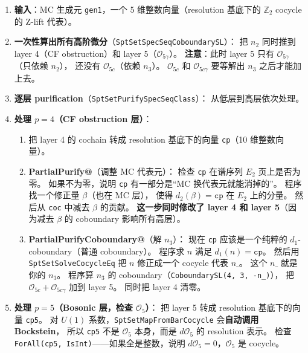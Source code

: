 \documentclass[a4paper,fontset=ubuntu,12pt]{ctexart}
\begin{document}
\begin{enumerate}
\item \textbf{输入}：MC 生成元 \texttt{gen1}，一个 5 维整数向量（resolution 基底下的 $\mathbb{Z}_2$ cocycle 的 Z-lift 代表）。

\item \textbf{一次性算出所有高阶微分}（\texttt{SptSetSpecSeqCoboundarySL}）：
      把 $n_2$ 同时推到 layer 4（CF obstruction）和 layer 5（$\mathcal{O}_{5\gamma}$）。
      \textbf{注意}：此时 layer 5 只有 $\mathcal{O}_{5\gamma}$（只依赖 $n_2$），
      还没有 $\mathcal{O}_{5c}$（依赖 $n_3$）。
      $\mathcal{O}_{5c}$ 和 $\mathcal{O}_{5c\gamma}$ 要等解出 $n_3$ 之后才能加上去。

\item \textbf{逐层 purification}（\texttt{SptSetPurifySpecSeqClass}）：
      从低层到高层依次处理。

\item \textbf{处理 $p=4$（CF obstruction 层）}：
      \begin{enumerate}[label=(\alph*)]
      \item 把 layer 4 的 cochain 转成 resolution 基底下的向量 \texttt{cp}（10 维整数向量）。
      \item \textbf{PartialPurify@}（调整 MC 代表元）：
            检查 \texttt{cp} 在谱序列 $E_2$ 页上是否为零。
            如果不为零，说明 \texttt{cp} 有一部分是``MC 换代表元就能消掉的''。
            程序找一个修正量 $\beta$（也在 MC 层），
            使得 $d_2(\beta) = \texttt{cp}$ 在 $E_2$ 上的分量。
            然后从 \texttt{coc} 中减去 $\beta$ 的贡献。
            \textbf{这一步同时修改了 layer 4 和 layer 5}（因为减去 $\beta$ 的 coboundary 影响所有高层）。
      \item \textbf{PartialPurifyCoboundary@}（解 $n_3$）：
            现在 \texttt{cp} 应该是一个纯粹的 $d_1$-coboundary（普通 coboundary）。
            程序求 $n$ 满足 $d_1(n) = \texttt{cp}$。
            然后用 \texttt{SptSetSolveCocycleEq} 把 $n$ 修正成一个 cocycle 代表 $n\_$。
            这个 $n\_$ 就是你的 $n_3$。
            程序算 $n_3$ 的 coboundary（\texttt{CoboundarySL(4, 3, -n\_)}），
            把 $\mathcal{O}_{5c} + \mathcal{O}_{5c\gamma}$ 加到 layer 5。
            同时把 layer 4 清零。
      \end{enumerate}

\item \textbf{处理 $p=5$（Bosonic 层，检查 $\mathcal{O}_5$）}：
      把 layer 5 转成 resolution 基底下的向量 \texttt{cp5}。
      对 $U(1)$ 系数，\texttt{SptSetMapFromBarCocycle} 会\textbf{自动调用 Bockstein}，
      所以 \texttt{cp5} 不是 $\mathcal{O}_5$ 本身，而是 $d\mathcal{O}_5$ 的 resolution 表示。
      检查 \texttt{ForAll(cp5, IsInt)}——如果全是整数，说明 $d\mathcal{O}_5 = 0$，$\mathcal{O}_5$ 是 cocycle。
\end{enumerate}
\end{document}
